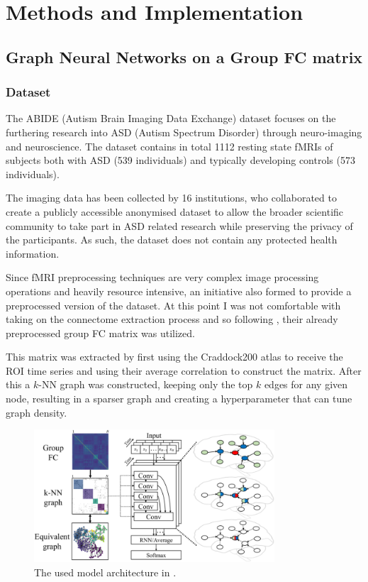 \chapter{Methods and Implementation}

\section{Graph Neural Networks on a Group FC matrix}

	\subsection{Dataset}
	\label{sec:ABIDE}
	
	The ABIDE (Autism Brain Imaging Data Exchange) dataset \cite{di2014autism} focuses on the furthering research into ASD (Autism Spectrum Disorder) through neuro-imaging and neuroscience. The dataset contains in total 1112 resting state fMRIs of subjects both with ASD (539 individuals) and typically developing controls (573 individuals). 
	
	The imaging data has been collected by 16 institutions, who collaborated to create a publicly accessible anonymised dataset to allow the broader scientific community to take part in ASD related research while preserving the privacy of the participants. As such, the dataset does not contain any protected health information. 
	
	Since fMRI preprocessing techniques are very complex image processing operations and heavily resource intensive, an initiative also formed to provide a preprocessed version of the dataset. At this point I was not comfortable with taking on the connectome extraction process and so following \cite{wang2021graph}, their already preprocessed group FC matrix was utilized. 
	
	This matrix was extracted by first using the Craddock200 atlas to receive the ROI time series and using their average correlation to construct the matrix. After this a $k$-NN graph was constructed, keeping only the top $k$ edges for any given node, resulting in a sparser graph and creating a hyperparameter that can tune graph density.
	
	\begin{figure}[!h]
		\centering
		\includegraphics[width=0.8\textwidth]{figures/cgcn.png}
		\caption{The used model architecture in \cite{wang2021graph}.}
	\end{figure}
	
